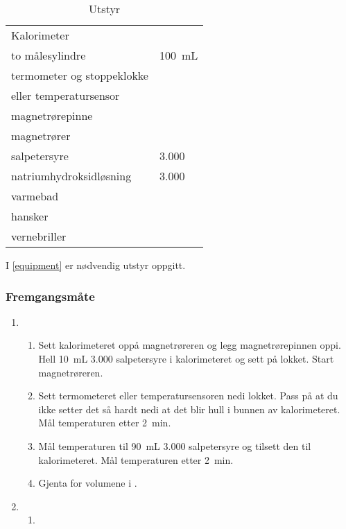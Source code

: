 	\begin{table}[H]
		\caption{Utstyr}
		\begin{tabular}{ll}
			\toprule
			Kalorimeter & \\
			to målesylindre & \SI{100}{\milli\liter} \\
			termometer og stoppeklokke & \\ 
			eller temperatursensor & \\
			magnetrørepinne & \\
			magnetrører & \\
			salpetersyre & \SI{3.000}{\molar} \\
			natriumhydroksidløsning & \SI{3.000}{\molar} \\
			varmebad & \\
			hansker & \\
			vernebriller & \\ 
			\bottomrule 
		\end{tabular}
		\label{equipment}
	\end{table}
	
	I \vref{equipment} er nødvendig utstyr oppgitt.	
	
	\subsubsection{Fremgangsmåte}
	\begin{enumerate}
		\item
		\begin{enumerate}
			\item Sett kalorimeteret oppå magnetrøreren og legg magnetrørepinnen oppi.  Hell \SI{10}{\milli\liter} \SI{3.000}{\molar} salpetersyre i kalorimeteret og sett på lokket. Start magnetrøreren. \label{lst:firststep}
			
			\item Sett termometeret eller temperatursensoren nedi lokket. Pass på at du ikke setter det så hardt nedi at det blir hull i bunnen av kalorimeteret. Mål temperaturen etter \SI{2}{\minute}.
			
			\item Mål temperaturen til \SI{90}{\milli\liter} \SI{3.000}{\molar} salpetersyre og tilsett den til kalorimeteret. Mål temperaturen etter \SI{2}{\minute}. \label{lst:thirdstep}
			
			\item Gjenta  for volumene i .
		\end{enumerate}
	
		\item
		\begin{enumerate}
			\item 
		\end{enumerate}	
	\end{enumerate}

